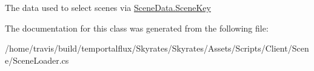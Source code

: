The data used to select scenes via \hyperlink{class_scene_data_a79d397b3deef242a865470283d96f2e6}{Scene\-Data.\-Scene\-Key} 



The documentation for this class was generated from the following file\-:\begin{DoxyCompactItemize}
\item 
/home/travis/build/temportalflux/\-Skyrates/\-Skyrates/\-Assets/\-Scripts/\-Client/\-Scene/Scene\-Loader.\-cs\end{DoxyCompactItemize}
